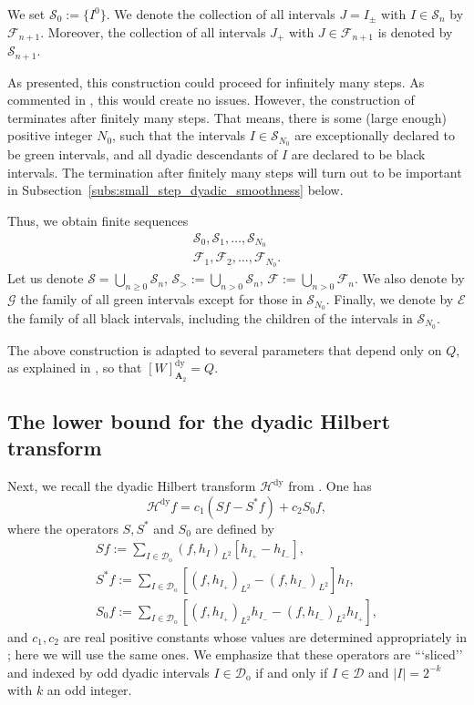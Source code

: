 \documentclass{amsart}
\newcommand{\cD}{\mathcal{D}}
\theoremstyle{definition}
\theoremstyle{remark}
\begin{document}
We set $\mathscr{S}_0:=\{I^0\}$. We denote the collection of all intervals $J=I_{\pm}$ with $I\in\mathscr{S}_n$ by $\mathscr{F}_{n+1}$. Moreover, the collection of all intervals $J_{+}$ with $J\in\mathscr{F}_{n+1}$ is denoted by $\mathscr{S}_{n+1}$.

As presented, this construction could proceed for infinitely many steps. As commented in \cite{DoPeTrVo}, this would create no issues. However, the construction of \cite{DoPeTrVo} terminates after finitely many steps. That means, there is some (large enough) positive integer $N_0$, such that the intervals $I\in\mathscr{S}_{N_0}$ are exceptionally declared to be green intervals, and all dyadic descendants of $I$ are declared to be black intervals. The termination after finitely many steps will turn out to be important in Subsection~\ref{subs:small_step_dyadic_smoothness} below.


Thus, we obtain finite sequences
\begin{gather*}
    \mathscr{S}_0,\mathscr{S}_1,\ldots,\mathscr{S}_{N_0}\\
    \mathscr{F}_1,\mathscr{F}_2,\ldots,\mathscr{F}_{N_0}.
\end{gather*}
Let us denote $\mathscr{S}=\bigcup_{n\geq0}\mathscr{S}_n$, $\mathscr{S}_{>}:=\bigcup_{n>0}\mathscr{S}_n$, $\mathscr{F}:=\bigcup_{n>0}\mathscr{F}_{n}$. We also denote by $\mathscr{G}$ the family of all green intervals except for those in $\mathscr{S}_{N_0}$. Finally, we denote by $\mathscr{E}$ the family of all black intervals, including the children of the intervals in $\mathscr{S}_{N_0}$.

The above construction is adapted to several parameters that depend only on $Q$, as explained in \cite[Section 4]{DoPeTrVo}, so that $[W]^{\mathrm{dy}}_{\mathbf{A}_2}=Q$.

\subsection{The lower bound for the dyadic Hilbert transform}
\label{subs:damage_large_step}

Next, we recall the dyadic Hilbert transform $\mathcal{H}^{\mathrm{dy}}$ from \cite[Section 6]{DoPeTrVo}. One has
\begin{equation*}
    \mathcal{H}^{\mathrm{dy}}f=c_1(Sf-S^{*}f)+c_2S_0f,
\end{equation*}
where the operators $S,S^{*}$ and $S_{0}$ are defined by
\begin{gather*}
    Sf:=\sum_{I\in\cD_{\mathrm{o}}}(f,h_{I})_{L^2}[h_{I_{+}}-h_{I_{-}}],\\
    S^{*}f:=\sum_{I\in\cD_{\mathrm{o}}}[(f,h_{I_{+}})_{L^2}-(f,h_{I_{-}})_{L^2}]h_{I},\\
    S_0f:=\sum_{I\in\cD_{\mathrm{o}}}[(f,h_{I_{+}})_{L^2}h_{I_{-}}-(f,h_{I_{-}})_{L^2}h_{I_{+}}],
\end{gather*}
and $c_1,c_2$ are real positive constants whose values are determined appropriately in \cite{DoPeTrVo}; here we will use the same ones. We emphasize that these operators are ```sliced'' and indexed by odd dyadic intervals $I\in \cD_{\mathrm{o}}$ if and only if $I\in \cD$ and $|I|=2^{-k}$ with $k$ an odd integer.
\end{document}
